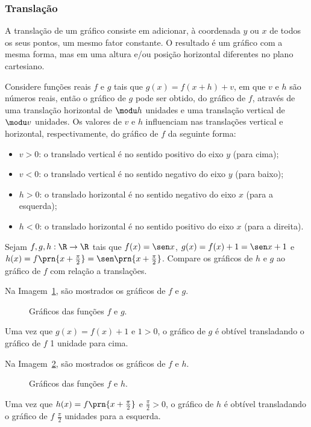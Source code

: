 \subsubsection{Translação}

A translação de um gráfico consiste em adicionar, à coordenada $y$ ou $x$ de todos os seus pontos, um mesmo fator constante.
O resultado é um gráfico com a mesma forma, mas em uma altura e/ou posição horizontal diferentes no plano cartesiano.

Considere funções reais $f$ e $g$ tais que $g(x) = f(x+h) + v$, em que $v$ e $h$ são números reais,
então o gráfico de $g$ pode ser obtido, do gráfico de $f$, através
de uma translação horizontal de $\modu h$ unidades e uma
translação vertical de $\modu v$ unidades.
Os valores de $v$ e $h$ influenciam nas translações vertical e horizontal, respectivamente, do gráfico de $f$ da seguinte forma:

\begin{itemize}
  \item $v > 0$: o translado vertical é no sentido positivo do eixo $y$ (para cima);
  \item $v < 0$: o translado vertical é no sentido negativo do eixo $y$ (para baixo);
  \item $h > 0$: o translado horizontal é no sentido negativo do eixo $x$ (para a esquerda);
  \item $h < 0$: o translado horizontal é no sentido positivo do eixo $x$ (para a direita).
\end{itemize}

\begin{example}
Sejam $f,g,h:\R \to \R$ tais que $f(x) = \sen x$, $g(x) = f(x) + 1 = \sen x +1$ e $h(x)= f\prn{x+\frac {\pi} 2}= \sen \prn{x+ \frac {\pi} 2}$.
Compare os gráficos de $h$ e $g$ ao gráfico de $f$ com relação a translações.
\end{example}

\begin{solution}
Na Imagem~\ref{img:grafico-translacao-exemplo-g}, são mostrados os gráficos de $f$ e $g$.
%
  \begin{figure}
    \centering
    \caption{Gráficos das funções $f$ e $g$.}
    \label{img:grafico-translacao-exemplo-g}
  \end{figure}
%
\noindent Uma vez que $g(x) = f(x)+1$ e $1>0$, o gráfico de $g$ é obtível transladando o gráfico de $f$ 1 unidade para cima.

Na Imagem~\ref{img:grafico-translacao-exemplo-h}, são mostrados os gráficos de $f$ e $h$.
%
  \begin{figure}
    \centering
    \caption{Gráficos das funções $f$ e $h$.}
    \label{img:grafico-translacao-exemplo-h}
  \end{figure}
%
\noindent Uma vez que $h(x) = f\prn{x+\frac {\pi} 2}$ e $\frac {\pi} 2>0$, o gráfico de $h$ é obtível transladando o gráfico de $f$ $\frac {\pi} 2$ unidades para a esquerda.
\end{solution}    